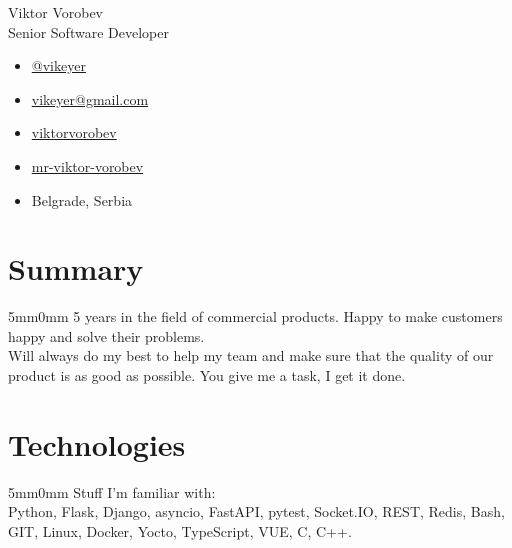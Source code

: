 \documentclass[10pt]{article}
\newcommand{\lmvalue}{5mm}
\newcommand{\rmvalue}{0mm}
\begin{document}
    \begin{minipage}[b]{0.78\linewidth}
    {\fontsize{28pt}{28pt}\selectfont Viktor Vorobev}
        \\[1em]
        {\color{gray}\fontsize{16pt}{16pt}\selectfont Senior Software Developer}
    \end{minipage}
    \hfill%
    \begin{minipage}[b]{0.24\linewidth}
        \begin{flushleft}
            \begin{itemize}
                \item[\color{cyan}\faPaperPlane] \href{https://t.me/vikeyer}{@vikeyer}
                \item[\color{cyan}\faEnvelope] \href{mailto:vikeyer@gmail.com}{vikeyer@gmail.com}
                \item[\color{cyan}\faGithub] \href{https://github.com/viktorvorobev}{viktorvorobev}
                \item[\color{cyan}\faLinkedin] \href{https://www.linkedin.com/in/mr-viktor-vorobev/}{mr-viktor-vorobev}
                \item[\faBuildingO] Belgrade, Serbia
            \end{itemize}
        \end{flushleft}
    \end{minipage}
    \vspace{3mm}
    \section*{Summary}
    \begin{changemargin}{\lmvalue}{\rmvalue}
        5 years in the field of commercial products.
        Happy to make customers happy and solve their problems.\\
        Will always do my best to help my team and make sure that the quality of our product is as good as possible. You give me a task, I get it done.
    \end{changemargin}
    \section*{Technologies}
    \begin{changemargin}{\lmvalue}{\rmvalue}
        Stuff I'm familiar with:\\
        Python, Flask, Django, asyncio, FastAPI, pytest, Socket.IO, REST, Redis, Bash, GIT, Linux,
        Docker, Yocto, TypeScript, VUE, C, C++.
    \end{changemargin}
\end{document}
